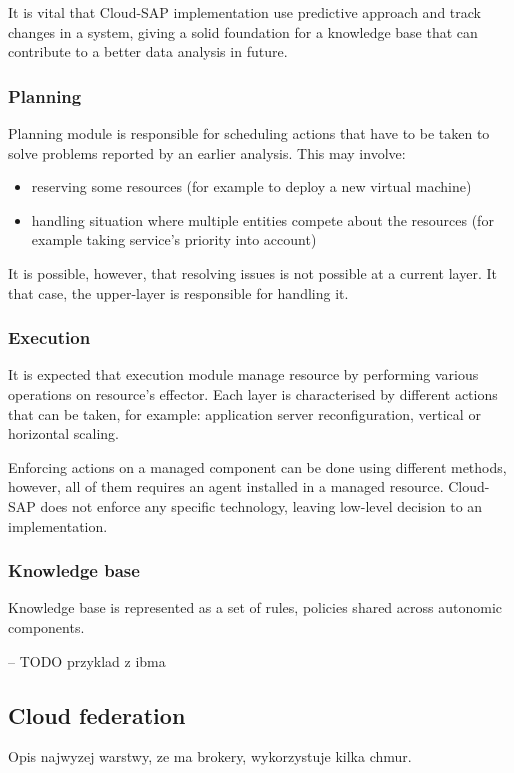 It is vital that Cloud-SAP implementation use predictive approach \cite{JiPeLiCh11} and track changes \cite{ZhYaWo05} in a system, giving a solid foundation for a knowledge base that can contribute to a better data analysis in future.

\subsubsection{Planning}
Planning module is responsible for scheduling actions that have to be taken to solve problems reported by an earlier analysis. This may involve:
\begin{itemize}
 \item reserving some resources (for example to deploy a new virtual machine)
 \item handling situation where multiple entities compete about the resources (for example taking service's priority into account)
\end{itemize}

It is possible, however, that resolving issues is not possible at a current layer. It that case, the upper-layer is responsible for handling it.

\subsubsection{Execution}
It is expected that execution module manage resource by performing various operations on resource's effector. Each layer is characterised by different actions that can be taken, for example: application server reconfiguration, vertical or horizontal scaling. 

Enforcing actions on a managed component can be done using different methods, however, all of them requires an agent installed in a managed resource. Cloud-SAP does not enforce any specific technology, leaving low-level decision to an implementation.

\subsubsection{Knowledge base}
Knowledge base is represented as a set of rules, policies shared across autonomic components.

-- TODO przyklad z ibma

\subsection{Cloud federation}
Opis najwyzej warstwy, ze ma brokery, wykorzystuje kilka chmur.


